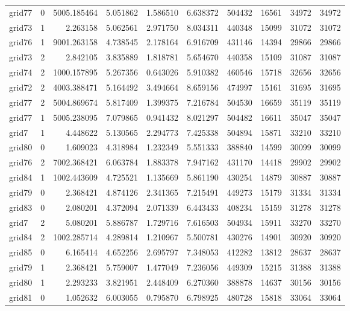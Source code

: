 \begin{longtable}{|l|r|r|r|r|r|r|r|r|r|}
grid77 & 0 & 5005.185464 & 5.051862 & 1.586510 & 6.638372 & 504432 & 16561 & 34972 & 34972 \\
grid73 & 1 & 2.263158 & 5.062561 & 2.971750 & 8.034311 & 440348 & 15099 & 31072 & 31072 \\
grid76 & 1 & 9001.263158 & 4.738545 & 2.178164 & 6.916709 & 431146 & 14394 & 29866 & 29866 \\
grid73 & 2 & 2.842105 & 3.835889 & 1.818781 & 5.654670 & 440358 & 15109 & 31087 & 31087 \\
grid74 & 2 & 1000.157895 & 5.267356 & 0.643026 & 5.910382 & 460546 & 15718 & 32656 & 32656 \\
grid72 & 2 & 4003.388471 & 5.164492 & 3.494664 & 8.659156 & 474997 & 15161 & 31695 & 31695 \\
grid77 & 2 & 5004.869674 & 5.817409 & 1.399375 & 7.216784 & 504530 & 16659 & 35119 & 35119 \\
grid77 & 1 & 5005.238095 & 7.079865 & 0.941432 & 8.021297 & 504482 & 16611 & 35047 & 35047 \\
grid7 & 1 & 4.448622 & 5.130565 & 2.294773 & 7.425338 & 504894 & 15871 & 33210 & 33210 \\
grid80 & 0 & 1.609023 & 4.318984 & 1.232349 & 5.551333 & 388840 & 14599 & 30099 & 30099 \\
grid76 & 2 & 7002.368421 & 6.063784 & 1.883378 & 7.947162 & 431170 & 14418 & 29902 & 29902 \\
grid84 & 1 & 1002.443609 & 4.725521 & 1.135669 & 5.861190 & 430254 & 14879 & 30887 & 30887 \\
grid79 & 0 & 2.368421 & 4.874126 & 2.341365 & 7.215491 & 449273 & 15179 & 31334 & 31334 \\
grid83 & 0 & 2.080201 & 4.372094 & 2.071339 & 6.443433 & 408234 & 15159 & 31278 & 31278 \\
grid7 & 2 & 5.080201 & 5.886787 & 1.729716 & 7.616503 & 504934 & 15911 & 33270 & 33270 \\
grid84 & 2 & 1002.285714 & 4.289814 & 1.210967 & 5.500781 & 430276 & 14901 & 30920 & 30920 \\
grid85 & 0 & 6.165414 & 4.652256 & 2.695797 & 7.348053 & 412282 & 13812 & 28637 & 28637 \\
grid79 & 1 & 2.368421 & 5.759007 & 1.477049 & 7.236056 & 449309 & 15215 & 31388 & 31388 \\
grid80 & 1 & 2.293233 & 3.821951 & 2.448409 & 6.270360 & 388878 & 14637 & 30156 & 30156 \\
grid81 & 0 & 1.052632 & 6.003055 & 0.795870 & 6.798925 & 480728 & 15818 & 33064 & 33064 \\

\end{longtable}
